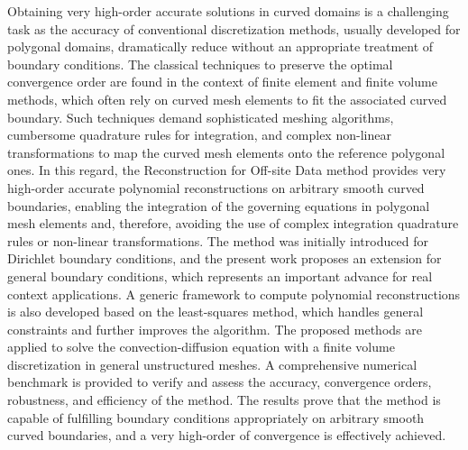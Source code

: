 \afterpage{\global\bodystyleheadertrue}


\begin{chapterabstract}
Obtaining very high-order accurate solutions in curved domains is a challenging task as the accuracy of conventional discretization methods, usually developed for polygonal domains, dramatically reduce without an appropriate treatment of boundary conditions.
The classical techniques to preserve the optimal convergence order are found in the context of finite element and finite volume methods, which often rely on curved mesh elements to fit the associated curved boundary.
Such techniques demand sophisticated meshing algorithms, cumbersome quadrature rules for integration, and complex non-linear transformations to map the curved mesh elements onto the reference polygonal ones.
In this regard, the Reconstruction for Off-site Data method provides very high-order accurate polynomial reconstructions on arbitrary smooth curved boundaries, enabling the integration of the governing equations in polygonal mesh elements and, therefore, avoiding the use of complex integration quadrature rules or non-linear transformations.
The method was initially introduced for Dirichlet boundary conditions, and the present work proposes an extension for general boundary conditions, which represents an important advance for real context applications.
A generic framework to compute polynomial reconstructions is also developed based on the least-squares method, which handles general constraints and further improves the algorithm.
The proposed methods are applied to solve the convection-diffusion equation with a finite volume discretization in general unstructured meshes.
A comprehensive numerical benchmark is provided to verify and assess the accuracy, convergence orders, robustness, and efficiency of the method.
The results prove that the method is capable of fulfilling boundary conditions appropriately on arbitrary smooth curved boundaries, and a very high-order of convergence is effectively achieved.
\end{chapterabstract}

